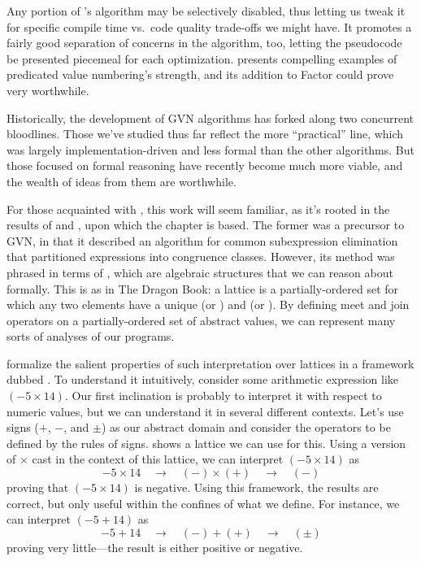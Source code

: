 Any portion of \citeauthor{Gargi}'s algorithm may be selectively disabled, thus
letting us tweak it for specific compile time vs.~code quality trade-offs we
might have.  It promotes a fairly good separation of concerns in the algorithm,
too, letting the pseudocode be presented piecemeal for each optimization.
 presents compelling examples of predicated value numbering's
strength, and its addition to Factor could prove very worthwhile.

Historically, the development of \gls{GVN} algorithms has forked along two
concurrent bloodlines.  Those we've studied thus far reflect the more
``practical'' line, which was largely implementation-driven and less formal
than the other algorithms.  But those focused on formal reasoning have recently
become much more viable, and the wealth of ideas from them are worthwhile.

For those acquainted with \cite[chapter 9 of][(The Dragon Book)]{DragonBook},
this work will seem familiar, as it's rooted in the results of
\citeauthor{Kildall} \autocite*{Kildall} and \citeauthor{Cousot}
\autocite*{Cousot}, upon which the chapter is based.  The former was a
precursor to \gls{GVN}, in that it described an algorithm for common
subexpression elimination that partitioned expressions into congruence classes.
However, its method was phrased in terms of , which are
algebraic structures that we can reason about formally.  This is as in The
Dragon Book: a lattice is a partially-ordered set for which any two elements
have a unique  (or ) and  (or ).  By defining meet and join operators on a
partially-ordered set of abstract values, we can represent many sorts of
analyses of our programs.

\citeauthor{Cousot} \autocite*{Cousot} formalize the salient properties of such
interpretation over lattices in a framework dubbed .  To understand it intuitively, consider some arithmetic
expression like $(-5 \times 14)$.  Our first inclination is probably to
interpret it with respect to numeric values, but we can understand it in
several different contexts.  Let's use signs ($+$, $-$, and $\pm$) as our
abstract domain and consider the operators to be defined by the rules of signs.
 shows a lattice we can use for this.  Using a version of
$\times$ cast in the context of this lattice, we can interpret $(-5 \times 14)$
as
%
$$-5 \times 14 \quad\to\quad (-) \times (+) \quad\to\quad (-)$$
%
proving that $(-5 \times 14)$ is negative.  Using this framework, the results
are correct, but only useful within the confines of what we define.  For
instance, we can interpret $(-5 + 14)$ as
%
$$-5 + 14 \quad\to\quad (-) + (+) \quad\to\quad (\pm)$$
%
proving very little---the result is either positive or negative.

